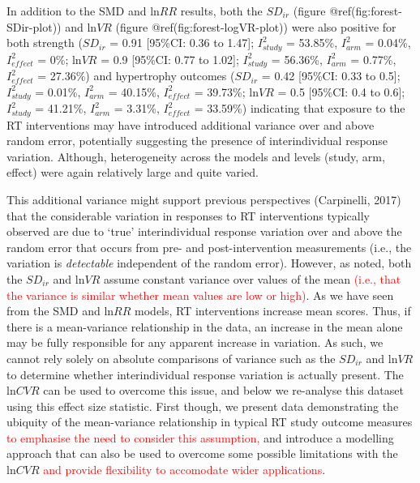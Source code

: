 \documentclass[
]{article}
\begin{document}
In addition to the SMD and \(\textrm{ln}RR\) results, both the \(SD_{ir}\) (figure @ref(fig:forest-SDir-plot)) and \(\textrm{ln}VR\) (figure @ref(fig:forest-logVR-plot)) were also positive for both strength (\(SD_{ir}\) = 0.91 {[}95\%CI: 0.36 to 1.47{]}; \(I^2_{study}\) = 53.85\%, \(I^2_{arm}\) = 0.04\%, \(I^2_{effect}\) = 0\%; \(\textrm{ln}VR\) = 0.9 {[}95\%CI: 0.77 to 1.02{]}; \(I^2_{study}\) = 56.36\%, \(I^2_{arm}\) = 0.77\%, \(I^2_{effect}\) = 27.36\%) and hypertrophy outcomes (\(SD_{ir}\) = 0.42 {[}95\%CI: 0.33 to 0.5{]}; \(I^2_{study}\) = 0.01\%, \(I^2_{arm}\) = 40.15\%, \(I^2_{effect}\) = 39.73\%; \(\textrm{ln}VR\) = 0.5 {[}95\%CI: 0.4 to 0.6{]}; \(I^2_{study}\) = 41.21\%, \(I^2_{arm}\) = 3.31\%, \(I^2_{effect}\) = 33.59\%) indicating that exposure to the RT interventions may have introduced additional variance over and above random error, potentially suggesting the presence of interindividual response variation. Although, heterogeneity across the models and levels (study, arm, effect) were again relatively large and quite varied.

This additional variance might support previous perspectives (Carpinelli, 2017) that the considerable variation in responses to RT interventions typically observed are due to `true' interindividual response variation over and above the random error that occurs from pre- and post-intervention measurements (i.e., the variation is \emph{detectable} independent of the random error). However, as noted, both the \(SD_{ir}\) and \(\textrm{ln}VR\) assume constant variance over values of the mean \textcolor{red}{(i.e., that the variance is similar whether mean values are low or high)}. As we have seen from the SMD and \(\textrm{ln}RR\) models, RT interventions increase mean scores. Thus, if there is a mean-variance relationship in the data, an increase in the mean alone may be fully responsible for any apparent increase in variation. As such, we cannot rely solely on absolute comparisons of variance such as the \(SD_{ir}\) and \(\textrm{ln}VR\) to determine whether interindividual response variation is actually present. The \(\textrm{ln}CVR\) can be used to overcome this issue, and below we re-analyse this dataset using this effect size statistic. First though, we present data demonstrating the ubiquity of the mean-variance relationship in typical RT study outcome measures \textcolor{red}{to emphasise the need to consider this assumption,} and introduce a modelling approach that can also be used to overcome some possible limitations with the \(\textrm{ln}CVR\) \textcolor{red}{and provide flexibility to accomodate wider applications}.
\end{document}

